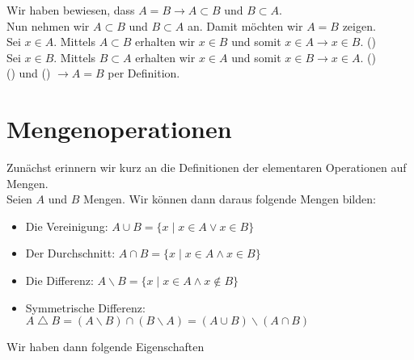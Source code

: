 Wir haben bewiesen, dass $A=B \to A\subset B \text{ und } B\subset A$. \\
Nun nehmen wir $A\subset B$ und $B\subset A$ an. Damit möchten wir $A=B$ zeigen. \\

Sei $x\in A$. Mittels $A\subset B$ erhalten wir $x\in B$ und somit $x\in A \to x\in B$. (\textasteriskcentered)\\

Sei $x\in B$. Mittels $B\subset A$ erhalten wir $x\in A$ und somit $x\in B \to x\in A$. (\textasteriskcentered\textasteriskcentered)\\

(\textasteriskcentered) und (\textasteriskcentered\textasteriskcentered) $\to A=B$ per Definition. 

\section{Mengenoperationen}
Zunächst erinnern wir kurz an die Definitionen der elementaren Operationen auf Mengen. \\

\noindent Seien $A$ und $B$ Mengen. Wir können dann daraus folgende Mengen bilden:

\begin{itemize}
\item Die Vereinigung: $A\cup B=\{x\mid x\in A \lor x\in B\}$
\item Der Durchschnitt: $A\cap B=\{x\mid x\in A \land x\in B\}$
\item Die Differenz: $A\backslash B=\{x\mid x\in A \land x\not\in B\}$
\item Symmetrische Differenz: $A\bigtriangleup B=\left(A\backslash B\right) \cap \left(B\backslash A\right)=\left(A\cup B\right)\backslash\left(A\cap B\right)$
\end{itemize}

\noindent Wir haben dann folgende Eigenschaften
